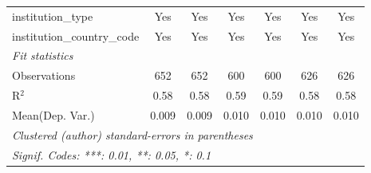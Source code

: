 \begin{tabular}{lcccccc}
   institution\_type                  & Yes     & Yes      & Yes     & Yes     & Yes       & Yes\\  
   institution\_country\_code         & Yes     & Yes      & Yes     & Yes     & Yes       & Yes\\  
   \midrule
   \emph{Fit statistics}\\
   Observations                       & 652     & 652      & 600     & 600     & 626       & 626\\  
   R$^2$                              & 0.58    & 0.58     & 0.59    & 0.59    & 0.58      & 0.58\\  
Mean(Dep. Var.) & 0.009 & 0.009 & 0.010 & 0.010 & 0.010 & 0.010 \\
   \midrule \midrule
   \multicolumn{7}{l}{\emph{Clustered (author) standard-errors in parentheses}}\\
   \multicolumn{7}{l}{\emph{Signif. Codes: ***: 0.01, **: 0.05, *: 0.1}}\\
\end{tabular}
\par\endgroup
